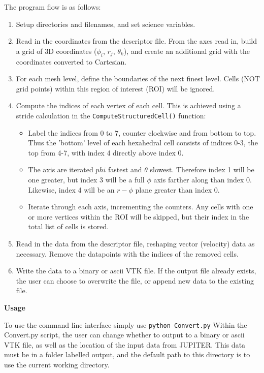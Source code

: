 \documentclass[twocolumn]{aastex62}
\begin{document}
The program flow is as follows:
\begin{enumerate}
	\item Setup directories and filenames, and set science variables.
	\item Read in the coordinates from the descriptor file. From the axes read in, build a grid of 3D coordinates ($\phi_{i}$, $r_{j}$, $\theta_{k}$), and create an additional grid with the coordinates converted to Cartesian. 
	\item For each mesh level, define the boundaries of the next finest level. Cells (NOT grid points) within this region of interest (ROI) will be ignored.
	\item Compute the indices of each vertex of each cell. This is achieved using a stride calculation in the \verb|ComputeStructuredCell()| function:	
	\begin{itemize}
		 \item Label the indices from 0 to 7, counter clockwise and from bottom to top. Thus the 'bottom' level of each hexahedral cell consists of indices 0-3, the top from 4-7, with index 4 directly above index 0.
		 \item The axis are iterated $phi$ fastest and $\theta$ slowest. Therefore index 1 will be one greater, but index 3 will be a full $\phi$ axis farther along than index 0. Likewise, index 4 will be an $r-\phi$ plane greater than index 0.
		 \item Iterate through each axis, incrementing the counters. Any cells with one or more vertices within the ROI will be skipped, but their index in the total list of cells is stored.
 	\end{itemize}
	\item Read in the data from the descriptor file, reshaping vector (velocity) data as necessary. Remove the datapoints with the indices of the removed cells.
	\item Write the data to a binary or ascii VTK file. If the output file already exists, the user can choose to overwrite the file, or append new data to the existing file.
\end{enumerate}

\textbf{Usage}

To use the command line interface simply use \verb|python Convert.py|
Within the Convert.py script, the user can change whether to output to a binary or ascii VTK file, as well as the location of the input data from JUPITER. This data must be in a folder labelled output, and the default path to this directory is to use the current working directory.
\end{document}
